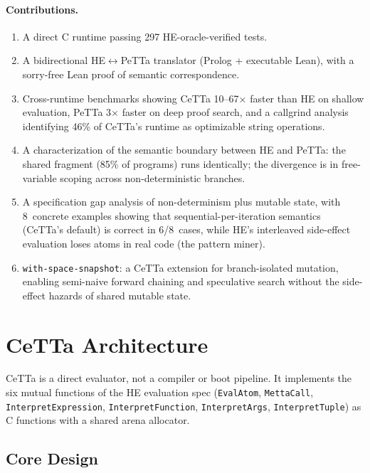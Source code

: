 \documentclass[11pt]{article}
\newcommand{\code}[1]{\texttt{#1}}
\newcommand{\PeTTa}{\textup{PeTTa}}
\newcommand{\HE}{\textup{HE}}
\newcommand{\CeTTa}{\textup{CeTTa}}
\begin{document}
\paragraph{Contributions.}
\begin{enumerate}
\item A direct C runtime passing 297 \HE{}-oracle-verified tests.
\item A bidirectional \HE{}$\leftrightarrow$\PeTTa{} translator
  (Prolog + executable Lean), with a sorry-free Lean proof of semantic
  correspondence.
\item Cross-runtime benchmarks showing \CeTTa{} 10--67$\times$ faster
  than \HE{} on shallow evaluation, \PeTTa{} 3$\times$ faster on deep
  proof search, and a callgrind analysis identifying 46\% of \CeTTa{}'s
  runtime as optimizable string operations.
\item A characterization of the semantic boundary between \HE{} and
  \PeTTa{}: the shared fragment (85\% of programs) runs identically; the
  divergence is in free-variable scoping across non-deterministic branches.
\item A specification gap analysis of non-determinism plus mutable state,
  with 8~concrete examples showing that sequential-per-iteration semantics
  (CeTTa's default) is correct in 6/8~cases, while \HE{}'s interleaved
  side-effect evaluation loses atoms in real code (the pattern miner).
\item \code{with-space-snapshot}: a CeTTa extension for branch-isolated
  mutation, enabling semi-naive forward chaining and speculative search
  without the side-effect hazards of shared mutable state.
\end{enumerate}

\section{\CeTTa{} Architecture}

\CeTTa{} is a direct evaluator, not a compiler or boot pipeline.  It
implements the six mutual functions of the \HE{} evaluation spec
(\code{EvalAtom}, \code{MettaCall}, \code{InterpretExpression},
\code{InterpretFunction}, \code{InterpretArgs}, \code{InterpretTuple})
as C functions with a shared arena allocator.

\subsection{Core Design}
\end{document}
